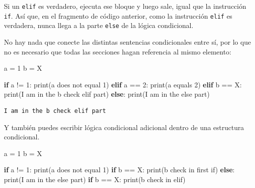 \documentclass[
  letterpaper,
]{scrbook}
\newenvironment{Shaded}{\begin{snugshade}}{\end{snugshade}}
\newcommand{\BuiltInTok}[1]{\textcolor[rgb]{0.00,0.23,0.31}{#1}}
\newcommand{\ControlFlowTok}[1]{\textcolor[rgb]{0.00,0.23,0.31}{\textbf{#1}}}
\newcommand{\DecValTok}[1]{\textcolor[rgb]{0.68,0.00,0.00}{#1}}
\newcommand{\NormalTok}[1]{\textcolor[rgb]{0.00,0.23,0.31}{#1}}
\newcommand{\OperatorTok}[1]{\textcolor[rgb]{0.37,0.37,0.37}{#1}}
\newcommand{\StringTok}[1]{\textcolor[rgb]{0.13,0.47,0.30}{#1}}
\begin{document}
Si un \texttt{elif} es verdadero, ejecuta ese bloque y luego sale, igual
que la instrucción \texttt{if}. Así que, en el fragmento de código
anterior, como la instrucción \texttt{elif} es verdadera, nunca llega a
la parte \texttt{else} de la lógica condicional.

No hay nada que conecte las distintas sentencias condicionales entre sí,
por lo que no es necesario que todas las secciones hagan referencia al
mismo elemento:

\begin{Shaded}
\begin{Highlighting}[]
\NormalTok{a }\OperatorTok{=} \DecValTok{1}
\NormalTok{b }\OperatorTok{=} \StringTok{\textquotesingle{}X\textquotesingle{}}

\ControlFlowTok{if}\NormalTok{ a }\OperatorTok{!=} \DecValTok{1}\NormalTok{:}
  \BuiltInTok{print}\NormalTok{(}\StringTok{\textquotesingle{}a does not equal 1\textquotesingle{}}\NormalTok{)}
\ControlFlowTok{elif}\NormalTok{ a }\OperatorTok{==} \DecValTok{2}\NormalTok{:}
  \BuiltInTok{print}\NormalTok{(}\StringTok{\textquotesingle{}a equals 2\textquotesingle{}}\NormalTok{)}
\ControlFlowTok{elif}\NormalTok{ b }\OperatorTok{==} \StringTok{\textquotesingle{}X\textquotesingle{}}\NormalTok{:}
  \BuiltInTok{print}\NormalTok{(}\StringTok{\textquotesingle{}I am in the b check elif part\textquotesingle{}}\NormalTok{)}
\ControlFlowTok{else}\NormalTok{:}
  \BuiltInTok{print}\NormalTok{(}\StringTok{\textquotesingle{}I am in the else part\textquotesingle{}}\NormalTok{)}
\end{Highlighting}
\end{Shaded}

\begin{verbatim}
I am in the b check elif part
\end{verbatim}

Y también puedes escribir lógica condicional adicional dentro de una
estructura condicional.

\begin{Shaded}
\begin{Highlighting}[]
\NormalTok{a }\OperatorTok{=} \DecValTok{1}
\NormalTok{b }\OperatorTok{=} \StringTok{\textquotesingle{}X\textquotesingle{}}

\ControlFlowTok{if}\NormalTok{ a }\OperatorTok{!=} \DecValTok{1}\NormalTok{:}
  \BuiltInTok{print}\NormalTok{(}\StringTok{\textquotesingle{}a does not equal 1\textquotesingle{}}\NormalTok{)}
  \ControlFlowTok{if}\NormalTok{ b }\OperatorTok{==} \StringTok{\textquotesingle{}X\textquotesingle{}}\NormalTok{:}
    \BuiltInTok{print}\NormalTok{(}\StringTok{\textquotesingle{}b check in first if\textquotesingle{}}\NormalTok{)}
\ControlFlowTok{else}\NormalTok{:}
  \BuiltInTok{print}\NormalTok{(}\StringTok{\textquotesingle{}I am in the else part\textquotesingle{}}\NormalTok{)}
  \ControlFlowTok{if}\NormalTok{ b }\OperatorTok{==} \StringTok{\textquotesingle{}X\textquotesingle{}}\NormalTok{:}
    \BuiltInTok{print}\NormalTok{(}\StringTok{\textquotesingle{}b check in elif\textquotesingle{}}\NormalTok{)}
\end{Highlighting}
\end{Shaded}
\end{document}
